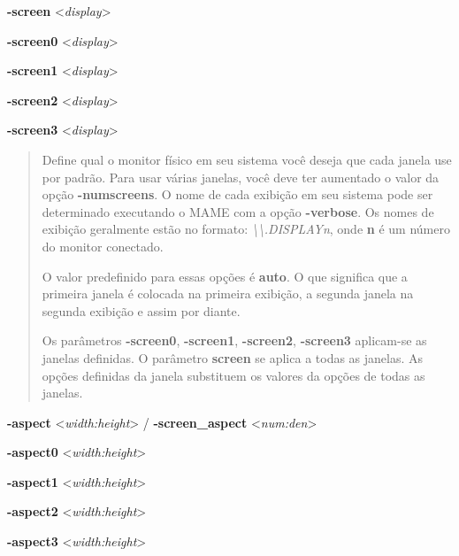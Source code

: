 \documentclass[letterpaper,10pt,brazil]{sphinxmanual}
\begin{document}
\begin{DUlineblock}{0em}
\item[] \textbf{-screen} \textless{}\emph{display}\textgreater{}
\item[] \textbf{-screen0} \textless{}\emph{display}\textgreater{}
\item[] \textbf{-screen1} \textless{}\emph{display}\textgreater{}
\item[] \textbf{-screen2} \textless{}\emph{display}\textgreater{}
\item[] \textbf{-screen3} \textless{}\emph{display}\textgreater{}
\end{DUlineblock}
\begin{quote}

Define qual o monitor físico em seu sistema você deseja que cada
janela use por padrão. Para usar várias janelas, você deve ter
aumentado o valor da opção \textbf{-numscreens}.
O nome de cada exibição em seu sistema pode ser determinado
executando o MAME com a opção \textbf{-verbose}.
Os nomes de exibição geralmente estão no formato: \emph{\textbackslash{}\textbackslash{}.DISPLAYn},
onde \textbf{n} é um número do monitor conectado.

O valor predefinido para essas opções é \textbf{auto}.
O que significa que a primeira janela é colocada na primeira
exibição, a segunda janela na segunda exibição e assim por diante.

Os parâmetros \textbf{-screen0}, \textbf{-screen1}, \textbf{-screen2}, \textbf{-screen3}
aplicam-se as janelas definidas. O parâmetro \textbf{screen} se aplica
a todas as janelas.
As opções definidas da janela substituem os valores da opções de
todas as janelas.
\end{quote}
\label{commandline/commandline-all:mame-commandline-aspect}
\begin{DUlineblock}{0em}
\item[] \textbf{-aspect} \textless{}\emph{width:height}\textgreater{} / \textbf{-screen\_aspect} \textless{}\emph{num:den}\textgreater{}
\item[] \textbf{-aspect0} \textless{}\emph{width:height}\textgreater{}
\item[] \textbf{-aspect1} \textless{}\emph{width:height}\textgreater{}
\item[] \textbf{-aspect2} \textless{}\emph{width:height}\textgreater{}
\item[] \textbf{-aspect3} \textless{}\emph{width:height}\textgreater{}
\end{DUlineblock}
\end{document}
